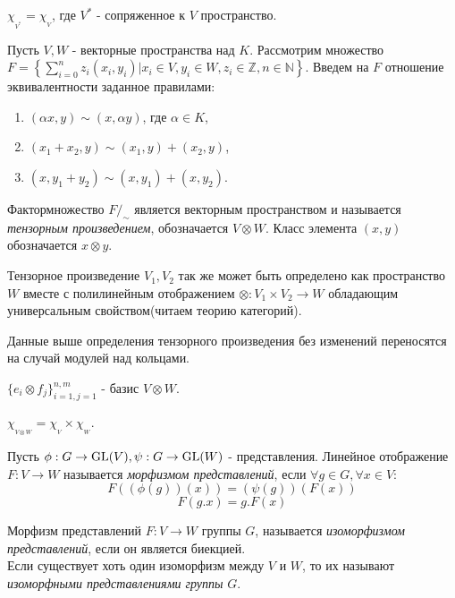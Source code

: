 \begin{ass}
$\chi_{_{V^*}} = \chi_{_V}$, где $V^*$ - сопряженное к $V$ пространство.
\end{ass}

\begin{defi}
Пусть $V,W$ - векторные пространства над $K$. Рассмотрим множество ${F=\left\{\sum\limits_{i=0}^nz_i(x_i,y_i)|x_i\in V,y_i\in W,z_i\in\mathbb{Z},n\in\mathbb{N}\right\}}$. Введем на $F$ отношение эквивалентности заданное правилами:
\begin{enumerate}
\item $(\alpha x,y)\sim(x,\alpha y)$, где $\alpha\in K$,
\item $(x_1+x_2,y)\sim (x_1,y)+(x_2,y)$,
\item $(x,y_1+y_2)\sim (x,y_1)+(x,y_2)$.
\end{enumerate}
Фактормножество $F/_\sim$ является векторным пространством и называется \textit{тензорным произведением}, обозначается $V\otimes W$. Класс элемента $(x,y)$ обозначается $x\otimes y$.
\end{defi}

\begin{remark}
Тензорное произведение $V_1,V_2$ так же может быть определено как пространство $W$ вместе с полилинейным отображением $\otimes:V_1\times V_2\to W$ обладающим универсальным свойством(читаем теорию категорий).
\end{remark}

\begin{remark}
Данные выше определения тензорного произведения без изменений переносятся на случай модулей над кольцами.
\end{remark}

\begin{ass}
$\{e_i\otimes f_j\}_{i=1,j=1}^{n,m}$ - базис $V\otimes W$. 
\end{ass}

\begin{ass}
$\chi_{_{V\otimes W}} = \chi_{_V} \times \chi_{_W}$.
\end{ass}

\begin{defi}
Пусть $\phi:G\to\operatorname{GL}(V),\psi:G\to\operatorname{GL}(W)$ - представления. Линейное отображение $F:V\to W$ называется \textit{морфизмом представлений}, если $\forall g\in G,\forall x\in V$:
$$F((\phi(g))(x)) = (\psi(g))(F(x))$$
$$F(g.x) = g.F(x)$$
\end{defi}

\begin{defi}
Морфизм представлений $F:V\to W$ группы $G$, называется \textit{изоморфизмом представлений}, если он является биекцией.\\
Если существует хоть один изоморфизм между $V$ и $W$, то их называют\textit{ изоморфными представлениями группы} $G$.
\end{defi}

